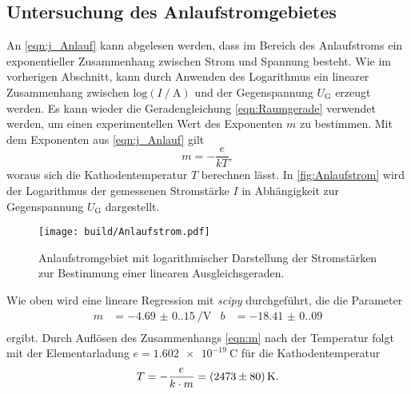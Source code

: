 \subsection{Untersuchung des Anlaufstromgebietes}
\label{subsec:A_Anlaufstrom}
An \autoref{eqn:j_Anlauf} kann abgelesen werden, dass im Bereich des Anlaufstroms ein exponentieller Zusammenhang zwischen Strom und Spannung besteht. Wie im vorherigen
Abschnitt, kann durch Anwenden des Logarithmus ein linearer Zusammenhang zwischen $\mathrm{log}(I \mathbin{/} \unit{\ampere})$ und der Gegenspannung $U_\text{G}$ erzeugt werden. 
Es kann wieder die Geradengleichung \eqref{eqn:Raumgerade} verwendet werden, um einen experimentellen Wert des Exponenten $m$ zu bestimmen.
Mit dem Exponenten aus \autoref{eqn:j_Anlauf} gilt
\begin{equation}
  \label{eqn:m}
  m = -\frac{e}{kT},
\end{equation}
woraus sich die Kathodentemperatur $T$ berechnen lässt.
In \autoref{fig:Anlaufstrom} wird der Logarithmus der gemessenen Stromstärke $I$ in Abhängigkeit zur Gegenspannung $U_\text{G}$ dargestellt.

\begin{figure}
  \centering
  \texttt{[image: build/Anlaufstrom.pdf]}
  \caption{Anlaufstromgebiet mit logarithmischer Darstellung der Stromstärken zur Bestimmung einer linearen Ausgleichsgeraden.}
  \label{fig:Anlaufstrom}
\end{figure}

Wie oben wird eine lineare Regression mit \textit{scipy} \cite{scipy} durchgeführt, die die Parameter 
\begin{align*}
  \label{eqn:Parameter2}
  m &= \qty{-4.69(0.15)}{\per\volt} & b &= \num{-18.41(0.09)} \\
\end{align*}
ergibt. Durch Auflösen des Zusammenhangs \eqref{eqn:m} nach der Temperatur folgt mit der Elementarladung $e = \qty{1.602e-19}{\coulomb}$ \cite{scipy} für die Kathodentemperatur
\begin{equation}
  \label{eqn:Temperatur}
  T = -\frac{e}{k \cdot m} = \qty{2473+-80}{\kelvin}.
\end{equation}

